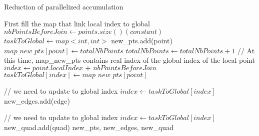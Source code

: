 \documentclass{article}
\begin{document}
\begin{algorithm}
\caption{Reduction of parallelized accumulation}
\begin{algorithmic}

\STATE First fill the map that link local index to global
\STATE $nbPointsBeforeJoin \leftarrow points.size() (constant)$
	\STATE $taskToGlobal \leftarrow map<int, int>$ 
			\STATE new\_pts.add(point)
			\STATE $map\_new\_pts[point] \leftarrow totalNbPoints$
			\STATE $totalNbPoints \leftarrow totalNbPoints + 1$
		\ENDIF
		\STATE // At this time, map\_new\_pts contains real index of the global index of the local point
		\STATE $index \leftarrow point.localIndex \texttt{ + } nbPointsBeforeJoin$
		\STATE $taskToGlobal[index]\leftarrow map\_new\_pts[point]$
	\ENDFOR

    \STATE
				\STATE // we need to update to global index
				\STATE $index \leftarrow taskToGlobal[index]$
			\ENDIF
			\ENDFOR
		\STATE new\_edges.add(edge)
        
    \STATE

				\STATE // we need to update to global index
				\STATE $index \leftarrow taskToGlobal[index]$
			\ENDIF
		\ENDFOR
		\STATE new\_quad.add(quad)
\STATE
\RETURN new\_pts, new\_edges, new\_quad
\ENDFOR

\end{algorithmic}
\end{algorithm}
\end{document}
